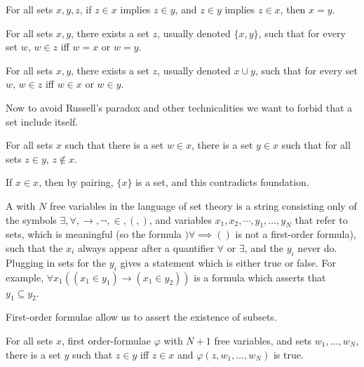 \begin{axiom}[extensionality]
For all sets $x, y, z$, if $z \in x$ implies $z \in y$, and $z \in y$ implies $z \in x$, then $x = y$.
\end{axiom}
\begin{axiom}[pairing]
For all sets $x, y$, there exists a set $z$, usually denoted $\{x, y\}$, such that for every set $w$, $w \in z$ iff $w = x$ or $w = y$.
\end{axiom}
\begin{axiom}[union]
For all sets $x, y$, there exists a set $z$, usually denoted $x \cup y$, such that for every set $w$, $w \in z$ iff $w \in x$ or $w \in y$.
\end{axiom}

\begin{subsec}
Now to avoid Russell's paradox and other technicalities we want to forbid that a set include itself.
\end{subsec}

\begin{axiom}[foundation]
For all sets $x$ such that there is a set $w \in x$, there is a set $y \in x$ such that for all sets $z \in y$, $z \notin x$.
\end{axiom}

\begin{subsec}
If $x \in x$, then by pairing, $\{x\}$ is a set, and this contradicts foundation.
\end{subsec}

\begin{subsec}
A  with $N$ free variables in the language of set theory is a string consisting only of the symbols $\exists,\forall,\to,\neg,\in,(,)$, and variables $x_1,x_2,\cdots, y_1,\dots,y_N$ that refer to sets, which is meaningful (so the formula $)\forall \implies()$ is not a first-order formula), such that the $x_i$ always appear after a quantifier $\forall$ or $\exists$, and the $y_i$ never do.
Plugging in sets for the $y_i$ gives a statement which is either true or false.
For example, $\forall x_1((x_1 \in y_1) \to (x_1 \in y_2))$ is a formula which asserts that $y_1 \subseteq y_2$.
\end{subsec}

\begin{subsec}
First-order formulae allow us to assert the existence of subsets.
\end{subsec}

\begin{axiom}
For all sets $x$, first order-formulae $\varphi$ with $N+1$ free variables, and sets $w_1, \dots, w_N$, there is a set $y$ such that $z \in y$ iff $z \in x$ and $\varphi(z, w_1, \dots, w_N)$ is true.
\end{axiom}


